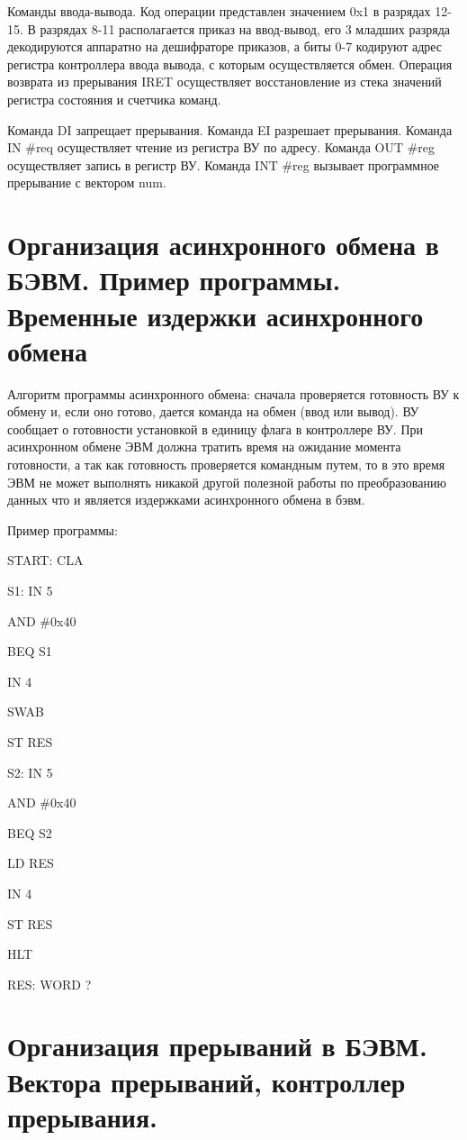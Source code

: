 \documentclass{article}
\begin{document}
Команды ввода-вывода. Код операции представлен значением 0x1 в разрядах 12-15. 
В разрядах 8-11 располагается приказ на ввод-вывод, его 3 младших разряда декодируются аппаратно на дешифраторе приказов, 
а биты 0-7 кодируют адрес регистра контроллера ввода вывода, с которым осуществляется обмен. 
Операция возврата из прерывания IRET осуществляет восстановление из стека значений регистра состояния и счетчика команд.

Команда DI запрещает прерывания. Команда EI разрешает прерывания. Команда IN \#req осуществляет чтение из регистра ВУ по адресу.
Команда OUT \#reg осуществляет запись в регистр ВУ. Команда INT \#reg вызывает программное прерывание с вектором num.






\section{Организация асинхронного обмена в БЭВМ. Пример программы. Временные издержки асинхронного обмена}
Алгоритм программы асинхронного обмена: сначала проверяется готовность ВУ к обмену и, если оно готово, 
дается команда на обмен (ввод или вывод). ВУ сообщает о готовности установкой в единицу флага в контроллере ВУ. 
При асинхронном обмене ЭВМ должна тратить время на ожидание момента готовности, а так как готовность проверяется командным путем, 
то в это время ЭВМ не может выполнять никакой другой полезной работы по преобразованию данных что и является издержками асинхронного обмена в бэвм.


Пример программы:


START: CLA 

S1: IN 5

AND \#0x40

BEQ S1

IN 4

SWAB

ST RES 

S2: IN 5

AND \#0x40

BEQ S2

LD RES 

IN 4

ST RES

HLT

RES: WORD ?


\section{Организация прерываний в БЭВМ. Вектора прерываний, контроллер прерывания.}
\end{document}
